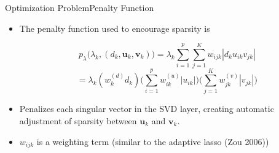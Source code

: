 \documentclass[notes]{beamer}       %
\begin{document}
\begin{frame}{Optimization Problem}{Penalty Function}
  \begin{itemize}
    \item{The penalty function used to encourage sparsity is 
   
   \[
   p_\lambda \big( \lambda_k, (d_k, \boldsymbol{u}_k, \boldsymbol{v}_k) \big) = \lambda_k \sum_{i=1}^p \sum_{j=1}^K w_{ijk} |d_k u_{ik} v_{jk} | 
   \]
   \begin{equation}\label{linreg.pres.reduced.rank.svd.penalty}
   = \lambda_k (w_k^{(d)} d_k) \Bigg( \sum_{i=1}^p w_{ik}^{(u)} |u_{ik}| \Bigg)\Bigg( \sum_{j=1}^K w_{jk}^{(v)} |v_{jk}| \Bigg)
   \end{equation}
   }
   \item{Penalizes each singular vector in the SVD layer, creating automatic adjustment of sparsity between \( \boldsymbol{u}_k\) and \(\boldsymbol{v}_k\).
   }
   
   \item{ \(w_{ijk}\) is a weighting term (similar to the adaptive lasso (Zou 2006))
   }
  \end{itemize}
\end{frame}


%   
%   
\end{document}
